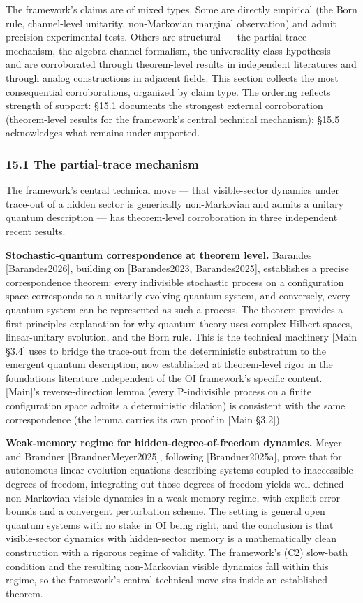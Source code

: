 \documentclass[
]{article}
\begin{document}
The framework's claims are of mixed types. Some are directly empirical
(the Born rule, channel-level unitarity, non-Markovian marginal
observation) and admit precision experimental tests. Others are
structural --- the partial-trace mechanism, the algebra-channel
formalism, the universality-class hypothesis --- and are corroborated
through theorem-level results in independent literatures and through
analog constructions in adjacent fields. This section collects the most
consequential corroborations, organized by claim type. The ordering
reflects strength of support: §15.1 documents the strongest external
corroboration (theorem-level results for the framework's central
technical mechanism); §15.5 acknowledges what remains under-supported.

\hypertarget{the-partial-trace-mechanism}{%
\subsubsection{15.1 The partial-trace
mechanism}\label{the-partial-trace-mechanism}}

The framework's central technical move --- that visible-sector dynamics
under trace-out of a hidden sector is generically non-Markovian and
admits a unitary quantum description --- has theorem-level corroboration
in three independent recent results.

\textbf{Stochastic-quantum correspondence at theorem level.} Barandes
{[}Barandes2026{]}, building on {[}Barandes2023, Barandes2025{]},
establishes a precise correspondence theorem: every indivisible
stochastic process on a configuration space corresponds to a unitarily
evolving quantum system, and conversely, every quantum system can be
represented as such a process. The theorem provides a first-principles
explanation for why quantum theory uses complex Hilbert spaces,
linear-unitary evolution, and the Born rule. This is the technical
machinery {[}Main §3.4{]} uses to bridge the trace-out from the
deterministic substratum to the emergent quantum description, now
established at theorem-level rigor in the foundations literature
independent of the OI framework's specific content. {[}Main{]}'s
reverse-direction lemma (every P-indivisible process on a finite
configuration space admits a deterministic dilation) is consistent with
the same correspondence (the lemma carries its own proof in {[}Main
§3.2{]}).

\textbf{Weak-memory regime for hidden-degree-of-freedom dynamics.} Meyer
and Brandner {[}BrandnerMeyer2025{]}, following {[}Brandner2025a{]},
prove that for autonomous linear evolution equations describing systems
coupled to inaccessible degrees of freedom, integrating out those
degrees of freedom yields well-defined non-Markovian visible dynamics in
a weak-memory regime, with explicit error bounds and a convergent
perturbation scheme. The setting is general open quantum systems with no
stake in OI being right, and the conclusion is that visible-sector
dynamics with hidden-sector memory is a mathematically clean
construction with a rigorous regime of validity. The framework's (C2)
slow-bath condition and the resulting non-Markovian visible dynamics
fall within this regime, so the framework's central technical move sits
inside an established theorem.
\end{document}
